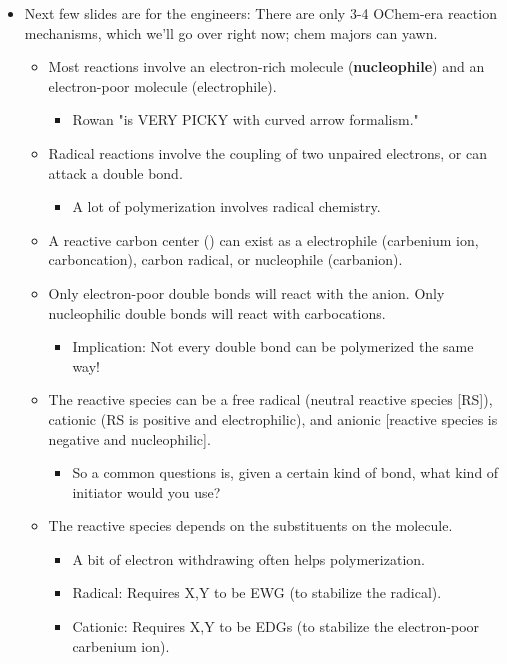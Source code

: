 \documentclass[../notes.tex]{subfiles}
\begin{document}
\begin{itemize}
    \item Next few slides are for the engineers: There are only 3-4 OChem-era reaction mechanisms, which we'll go over right now; chem majors can yawn.
    \begin{itemize}
        \item Most reactions involve an electron-rich molecule (\textbf{nucleophile}) and an electron-poor molecule (electrophile).
        \begin{itemize}
            \item Rowan "is VERY PICKY with curved arrow formalism."
        \end{itemize}
        \item Radical reactions involve the coupling of two unpaired electrons, or can attack a double bond.
        \begin{itemize}
            \item A lot of polymerization involves radical chemistry.
        \end{itemize}
        \item A reactive carbon center () can exist as a electrophile (carbenium ion, carboncation), carbon radical, or nucleophile (carbanion).
        \item Only electron-poor double bonds will react with the anion. Only nucleophilic double bonds will react with carbocations.
        \begin{itemize}
            \item Implication: Not every double bond can be polymerized the same way!
        \end{itemize}
        \item The reactive species can be a free radical (neutral reactive species [RS]), cationic (RS is positive and electrophilic), and anionic [reactive species is negative and nucleophilic].
        \begin{itemize}
            \item So a common questions is, given a certain kind of bond, what kind of initiator would you use?
        \end{itemize}
        \item The reactive species depends on the substituents on the molecule.
        \begin{itemize}
            \item A bit of electron withdrawing often helps polymerization.
            \item Radical: Requires X,Y to be EWG (to stabilize the radical).
            \item Cationic: Requires X,Y to be EDGs (to stabilize the electron-poor carbenium ion).

\end{itemize}
\end{itemize}
\end{itemize}
\end{document}
